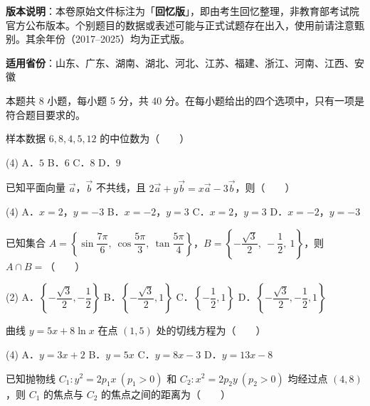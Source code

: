 

\begin{gknotice}
\textbf{ 版本说明}：本卷原始文件标注为「\textbf{回忆版}」，即由考生回忆整理，非教育部考试院官方公布版本。个别题目的数据或表述可能与正式试题存在出入，使用前请注意甄别。其余年份（2017–2025）均为正式版。

\textbf{适用省份}：山东、广东、湖南、湖北、河北、江苏、福建、浙江、河南、江西、安徽
\end{gknotice}

\par\medskip


\begin{gktip}
本题共 8 小题，每小题 5 分，共 40 分。在每小题给出的四个选项中，只有一项是符合题目要求的。
\end{gktip}

样本数据 $6,8,4,5,12$ 的中位数为（　　）

\begin{gkopts}(4)
\task A．$5$
\task B．$6$
\task C．$8$
\task D．$9$
\end{gkopts}

已知平面向量 $\vec{a}$，$\vec{b}$ 不共线，且 $2\vec{a}+y\vec{b}=x\vec{a}-3\vec{b}$，则（　　）

\begin{gkopts}(4)
\task A．$x=2$，$y=-3$
\task B．$x=-2$，$y=3$
\task C．$x=2$，$y=3$
\task D．$x=-2$，$y=-3$
\end{gkopts}

已知集合 $A=\left\{\sin\dfrac{7\pi}{6},\ \cos\dfrac{5\pi}{3},\ \tan\dfrac{5\pi}{4}\right\}$，$B=\left\{-\dfrac{\sqrt{3}}{2},\ -\dfrac{1}{2},\ 1\right\}$，则 $A\cap B=$（　　）

\begin{gkopts}(2)
\task A．$\left\{-\dfrac{\sqrt{3}}{2},-\dfrac{1}{2}\right\}$
\task B．$\left\{-\dfrac{\sqrt{3}}{2},1\right\}$
\task C．$\left\{-\dfrac{1}{2},1\right\}$
\task D．$\left\{-\dfrac{\sqrt{3}}{2},-\dfrac{1}{2},1\right\}$
\end{gkopts}

曲线 $y=5x+8\ln x$ 在点 $(1,5)$ 处的切线方程为（　　）

\begin{gkopts}(4)
\task A．$y=3x+2$
\task B．$y=5x$
\task C．$y=8x-3$
\task D．$y=13x-8$
\end{gkopts}

已知抛物线 $C_1:y^2=2p_1x\ (p_1>0)$ 和 $C_2:x^2=2p_2y\ (p_2>0)$ 均经过点 $(4,8)$，则 $C_1$ 的焦点与 $C_2$ 的焦点之间的距离为（　　）

